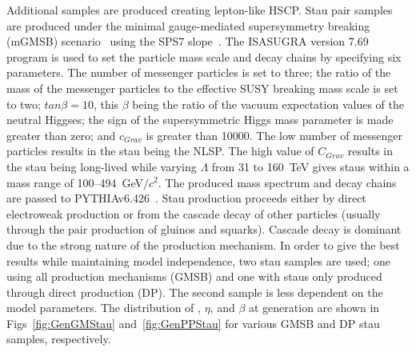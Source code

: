 Additional samples are produced creating lepton-like HSCP. Stau pair samples
are produced under the minimal gauge-mediated supersymmetry breaking (mGMSB) scenario~\cite{Giudice:1998bp} using the SPS7 slope~\cite{Allanach:2002nj}.
The ISASUGRA version 7.69~\cite{Paige:2003mg} program is used to set the particle mass scale and decay chains by specifying six parameters.
The number of messenger particles is set to three; the ratio of the mass of the messenger particles to the effective SUSY breaking mass scale is set to two;
$tan \beta = 10$, this $\beta$ being the ratio of the vacuum expectation values of the neutral Higgses;
the sign of the supersymmetric Higgs mass parameter is made greater than zero; and $c_{Grav}$ is greater than 10000.
The low number of messenger particles results in the stau being the NLSP.
The high value of $C_{Grav}$ results in the stau being long-lived while varying $\Lambda$ from 31 to 160~TeV gives staus within a mass range of 100--494~GeV$/c^2$. 
The produced mass spectrum and decay chains are passed to PYTHIAv6.426~\cite{Sjostrand:2006za}. Stau production proceeds either by direct electroweak production or from the cascade
decay of other particles (usually through the pair production of gluinos and squarks). Cascade decay is dominant due to the strong nature of the production mechanism.
In order to give the best results while maintaining model independence, two stau samples are used; one using all production mechanisms (GMSB) and one with staus only
produced through direct production (DP). The second sample is less dependent on the model parameters. The distribution of \pt, $\eta$, and $\beta$ at generation
are shown in Figs~\ref{fig:GenGMStau} and~\ref{fig:GenPPStau} for various GMSB and DP stau samples, respectively.

